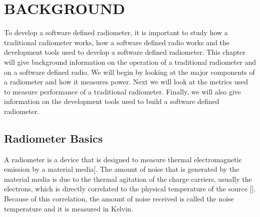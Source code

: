 

\chapter{BACKGROUND}\label{ch:background}

To develop a software defined radiometer, it is important to study how a traditional radiometer works, how a software defined radio works and the development tools used to develop a software defined radiometer.  This chapter will give background information on the operation of a traditional radiometer and on a software defined radio.  We will begin by looking at the major components of a radiometer and how it measures power.  Next we will look at the metrics used to measure performance of a traditional radiometer.  Finally, we will also give information on the development tools used to build a software defined radiometer.  


\section{Radiometer Basics}\label{rad_basics}
A radiometer is a device that is designed to measure thermal electromagnetic emission by a material media[\cite{ulaby}.  The amount of noise that is generated by the material media is due to the thermal agitation of the charge carriers, usually the electrons, which is directly correlated to the physical temperature of the source [\cite{Nyquist1928thermal}].  Because of this correlation, the amount of noise received is called the noise temperature and it is measured in Kelvin. 

